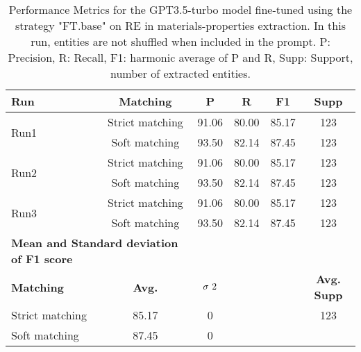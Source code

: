 \begin{table}[htbp]
    \small
    \centering
    \caption{Performance Metrics for the GPT3.5-turbo model fine-tuned using the strategy "FT.base" on RE in materials-properties extraction. In this run, entities are not shuffled when included in the prompt. P: Precision, R: Recall, F1: harmonic average of P and R, Supp: Support, number of extracted entities.}
    \begin{tabular}{lccccc}
        \toprule
        \textbf{Run} & \textbf{Matching} & \textbf{P} & \textbf{R} & \textbf{F1} & \textbf{Supp} \\
        \midrule
        \multirow{2}{*}{Run1} & Strict matching & 91.06 & 80.00 & 85.17 & 123 \\
        & Soft matching & 93.50 & 82.14 & 87.45 & 123 \\
        \midrule
        \multirow{2}{*}{Run2} & Strict matching & 91.06 & 80.00 & 85.17 & 123 \\
        & Soft matching & 93.50 & 82.14 & 87.45 & 123 \\
        \midrule
        \multirow{2}{*}{Run3} & Strict matching & 91.06 & 80.00 & 85.17 & 123 \\
        & Soft matching & 93.50 & 82.14 & 87.45 & 123 \\
        \midrule
        \multicolumn{2}{l}{\textbf{Mean and Standard deviation of F1 score}} & & & & \\
        \midrule
        \textbf{Matching} & \textbf{Avg.} & $\sigma\textsuperscript{2}$ & & & \textbf{Avg. Supp}\\
        Strict matching & 85.17 & 0 &  & &  123 \\
        Soft matching & 87.45 & 0 & \\
        \bottomrule
    \end{tabular}
\end{table}


